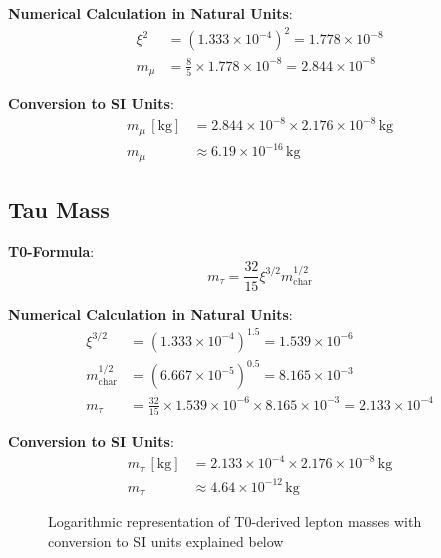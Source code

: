 \documentclass[12pt,a4paper]{article}
\newcommand{\xipar}{\xi}
\newcommand{\mchar}{m_{\text{char}}}
\begin{document}
	\textbf{Numerical Calculation in Natural Units}:
	\begin{align}
		\xipar^2 &= (1{.}333 \times 10^{-4})^2 = 1{.}778 \times 10^{-8} \\
		m_\mu &= \frac{8}{5} \times 1{.}778 \times 10^{-8} = 2{.}844 \times 10^{-8}
	\end{align}
	
	\textbf{Conversion to SI Units}:
	\begin{align}
		m_\mu \,[\text{kg}] &= 2{.}844 \times 10^{-8} \times 2{.}176 \times 10^{-8}\,\text{kg} \\
		m_\mu &\approx 6{.}19 \times 10^{-16}\,\text{kg}
	\end{align}
	
	\subsection{Tau Mass}
	
	\textbf{T0-Formula}:
	\begin{equation}
		m_\tau = \frac{32}{15} \xipar^{3/2} \mchar^{1/2}
	\end{equation}
	
	\textbf{Numerical Calculation in Natural Units}:
	\begin{align}
		\xipar^{3/2} &= (1{.}333 \times 10^{-4})^{1{.}5} = 1{.}539 \times 10^{-6} \\
		\mchar^{1/2} &= (6{.}667 \times 10^{-5})^{0{.}5} = 8{.}165 \times 10^{-3} \\
		m_\tau &= \frac{32}{15} \times 1{.}539 \times 10^{-6} \times 8{.}165 \times 10^{-3} = 2{.}133 \times 10^{-4}
	\end{align}
	
	\textbf{Conversion to SI Units}:
	\begin{align}
		m_\tau \,[\text{kg}] &= 2{.}133 \times 10^{-4} \times 2{.}176 \times 10^{-8}\,\text{kg} \\
		m_\tau &\approx 4{.}64 \times 10^{-12}\,\text{kg}
	\end{align}
	
	\begin{figure}[H]
		\centering
		\caption{Logarithmic representation of T0-derived lepton masses with conversion to SI units explained below}
	\end{figure}
	
\end{document}
